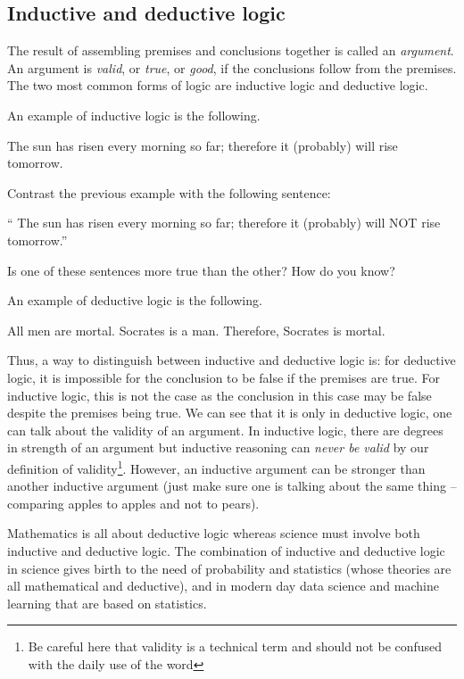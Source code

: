     
\subsection{Inductive and deductive logic}
The result of assembling premises and conclusions together is called an \emph{argument}.
An argument is \emph{valid}, or \emph{true}, or \emph{good}, if the conclusions follow from the premises.
The two most common forms of logic are inductive logic and deductive logic.

An example of inductive logic is the following.
\begin{example}
    The sun has risen every morning so far; therefore it (probably) will rise tomorrow.
\end{example}

\begin{exercise}
    Contrast the previous example with the following sentence:

    `` The sun has risen every morning so far; therefore it (probably) will NOT rise tomorrow.''

   Is one of these sentences more true than the other? How do you know?
\end{exercise}

An example of deductive logic is the following.
\begin{example}
   All men are mortal. Socrates is a man. Therefore, Socrates is mortal. 
\end{example}

Thus, a way to distinguish between inductive and deductive logic is:
for deductive logic, it is impossible for the conclusion to be false if the premises are true.
For inductive logic, this is not the case as the conclusion in this case may be false
despite the premises being true.
We can see that it is only in deductive logic, one can talk about the validity of an argument.
In inductive logic, there are degrees in strength of an argument but inductive reasoning 
can \emph{never be valid} by our definition of validity\footnote{Be careful here that
    validity is a technical term and should not be confused with the daily use of 
the word}.
However, an inductive argument can be stronger than another inductive argument 
(just make sure one is talking about the same thing -- comparing apples to apples and not to pears).

Mathematics is all about deductive logic whereas science must involve both inductive
and deductive logic.
The combination of inductive and deductive logic in science gives birth to the need of probability and
statistics (whose theories are all mathematical and deductive), and in modern day data science and machine learning that are based on statistics.

